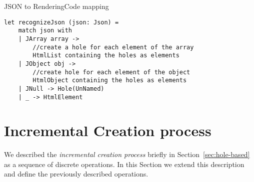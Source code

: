 \begin{listing}[H]
	\caption {JSON to RenderingCode mapping}
	\begin{lstlisting}
let recognizeJson (json: Json) =
    match json with
    | JArray array -> 
        //create a hole for each element of the array
        HtmlList containing the holes as elements
    | JObject obj ->
        //create hole for each element of the object 
        HtmlObject containing the holes as elements
    | JNull -> Hole(UnNamed)
    | _ -> HtmlElement 
  \end{lstlisting}
\end{listing}

\section{Incremental Creation process}

We described the \emph{incremental creation process} briefly in Section~\ref{sec:hole-based} as a sequence of discrete operations.
In this Section we extend this description and define the previously described operations.

